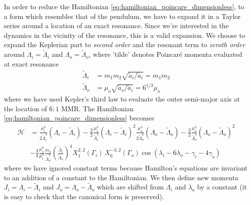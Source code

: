 In order to reduce the Hamiltonian \ref{eq:hamiltonian_poincare_dimensionless},
to a form which resembles that of the pendulum, we have to expand it in a 
Taylor series around a location of an exact resonance. Since we're interested
in the dynamics in the vicinity of the resonance, this is a valid expansion.
We choose to expand the Keplerian part to \emph{second order} and the
resonant term to \emph{zeroth order} around $\Lambda_i=\tilde{\Lambda}_i$ 
and $\Lambda_o=\tilde{\Lambda}_o$, where 'tilde' denotes Poincaré
momenta evaluated at exact resonance
\begin{equation}
    \begin{align}
        \tilde{\Lambda}_i&=m_1m_2\sqrt{\tilde{a}_i/\tilde{a}_i}=m_1m_2\\
        \tilde{\Lambda}_o&=\mu_o\sqrt{\tilde{a}_o/\tilde{a}_i}=6^{1/3}\mu_o
    \end{align}
\end{equation}
where we have used Kepler's third law to evaluate the outer semi-major axis
at the location of $6:1$ MMR. The Hamiltonian 
\ref{eq:hamiltonian_poincare_dimensionless} becomes
\begin{equation}
    \begin{aligned}
        \mathcal{H}&=\frac{\mu_i^3}{2\tilde{\Lambda}_i^3}
        (\Lambda_i-\tilde{\Lambda}_i) - \frac{3}{2}
        \frac{\mu_i^3}{\tilde{\Lambda}_i^4} (\Lambda_i-\tilde{\Lambda}_i)^2
    \frac{\mu_o^3}{2\tilde{\Lambda}_o^3}
        (\Lambda_o-\tilde{\Lambda}_o) - \frac{3}{2}
        \frac{\mu_o^3}{\tilde{\Lambda}_o^4} (\Lambda_o-\tilde{\Lambda}_o)^2\\
        &-\frac{3}{4} \frac{\mu_o^6}{\mu_i^3} 
        \frac{m_3}{\tilde{\Lambda}_o^2} \left(\frac{\tilde{\Lambda}_i}
        {\tilde{\Lambda}_o}\right)^4
    X^{2,2}_1(\Gamma_i)\,X^{-3,2}_6(\Gamma_o)\cos(\lambda_i-6\lambda_o
    -\gamma_i - 4\gamma_o)
    \end{aligned}
    \label{eq:hamiltonian_poincare_dimensionless_expanded}
\end{equation}
where we have ignored constant terms because Hamilton's equations are invariant
to an addition of a constant to the Hamiltonian. We then define new momenta
$J_i=\Lambda_i-\tilde{\Lambda}_i$ and $J_o=\Lambda_o-\tilde{\Lambda}_o$ 
which are shifted from $\Lambda_i$ and $\lambda_o$ by a constant (it is easy 
to check that the canonical form is preserved).
